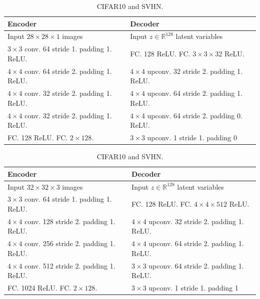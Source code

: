 \begin{table}[!h]
\caption{Architecture of VAE and GMM-VAE}
    \centering
        \vspace*{1ex}
    \begin{subtable}[h]{\textwidth}
    \caption{MNIST and Fashion-MNIST.}
    \centering
        \begin{tabular}{|l|l|}
        \toprule
        \textbf{Encoder} & \textbf{Decoder} \\
        \midrule
        Input $28\times28\times1$ images & Input $z\in \mathbb{R}^{128}$ latent variables \\
        \hline 
        $3\times3$ conv. 64 stride 1. padding 1. ReLU. & FC. 128 ReLU. FC. $3\times3\times32$ ReLU. \\
        \hline 
        $4\times4$ conv. 64 stride 2. padding 1. ReLU. & $4\times4$ upconv. 32 stride 2. padding 1. ReLU. \\
        \hline 
        $4\times4$ conv. 32 stride 2. padding 1. ReLU. & $4\times4$ upconv. 64 stride 2. padding 1. ReLU. \\
        \hline
        $4\times4$ conv. 32 stride 2. padding 1. ReLU. & $4\times4$ upconv. 64 stride 2. padding 0. ReLU. \\
        \hline
        FC. 128 ReLU. FC. $2\times128$. & $3\times3$ upconv. 1 \hspace{0.2em} stride 1. padding 0 \\
        \bottomrule
        \end{tabular}
    \vspace*{1ex}
    \end{subtable}
    \begin{subtable}[h]{\textwidth}
    \caption{CIFAR10 and SVHN.}
    \centering
        \begin{tabular}{|l|l|}
        \toprule
        \textbf{Encoder} & \textbf{Decoder} \\
        \midrule
        Input $32\times32\times3$ images & Input $z\in \mathbb{R}^{128}$ latent variables \\
        \hline 
        $3\times3$ conv. 64 stride 1. padding 1. ReLU. & FC. 128 ReLU. FC. $4\times4\times512$ ReLU. \\
        \hline 
        $4\times4$ conv. 128  stride 2. padding 1. ReLU. &  $4\times4$ upconv. 32 stride 2. padding 1. ReLU. \\
        \hline 
        $4\times4$ conv. 256  stride 2. padding 1. ReLU. & $4\times4$ upconv. 64 stride 2. padding 1. ReLU. \\
        \hline
        $4\times4$ conv. 512  stride 2. padding 1. ReLU. & $3\times3$ upconv. 64 stride 2. padding 1. ReLU. \\
        \hline
        FC. 1024 ReLU. FC. $2\times128$. & $3\times3$ upconv. 1 \hspace{0.2em} stride 1. padding 1 \\
        \bottomrule
        \end{tabular}
    \vspace*{1ex}
    \end{subtable}
    \label{app:tab:arch-vae}
\end{table}


